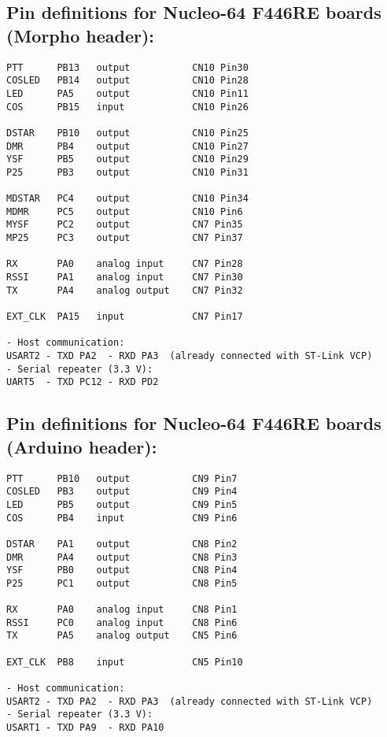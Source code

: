 \documentclass[]{article}
\begin{document}
\subsection{Pin definitions for Nucleo-64 F446RE boards (Morpho header):}

\begin{verbatim}
PTT      PB13   output           CN10 Pin30
COSLED   PB14   output           CN10 Pin28
LED      PA5    output           CN10 Pin11
COS      PB15   input            CN10 Pin26

DSTAR    PB10   output           CN10 Pin25
DMR      PB4    output           CN10 Pin27
YSF      PB5    output           CN10 Pin29
P25      PB3    output           CN10 Pin31

MDSTAR   PC4    output           CN10 Pin34
MDMR     PC5    output           CN10 Pin6
MYSF     PC2    output           CN7 Pin35
MP25     PC3    output           CN7 Pin37

RX       PA0    analog input     CN7 Pin28
RSSI     PA1    analog input     CN7 Pin30
TX       PA4    analog output    CN7 Pin32

EXT_CLK  PA15   input            CN7 Pin17

- Host communication:
USART2 - TXD PA2  - RXD PA3  (already connected with ST-Link VCP)
- Serial repeater (3.3 V):
UART5  - TXD PC12 - RXD PD2
\end{verbatim}

\subsection{Pin definitions for Nucleo-64 F446RE boards (Arduino header):}

\begin{verbatim}
PTT      PB10   output           CN9 Pin7
COSLED   PB3    output           CN9 Pin4
LED      PB5    output           CN9 Pin5
COS      PB4    input            CN9 Pin6

DSTAR    PA1    output           CN8 Pin2
DMR      PA4    output           CN8 Pin3
YSF      PB0    output           CN8 Pin4
P25      PC1    output           CN8 Pin5

RX       PA0    analog input     CN8 Pin1
RSSI     PC0    analog input     CN8 Pin6
TX       PA5    analog output    CN5 Pin6

EXT_CLK  PB8    input            CN5 Pin10

- Host communication:
USART2 - TXD PA2  - RXD PA3  (already connected with ST-Link VCP)
- Serial repeater (3.3 V):
USART1 - TXD PA9  - RXD PA10
\end{verbatim}
\end{document}

